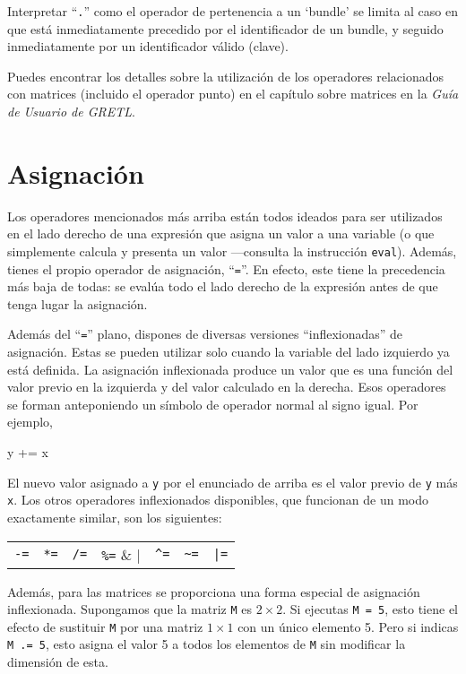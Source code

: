 Interpretar ``\texttt{.}'' como el operador de pertenencia  a un `bundle'
se limita al caso en que está inmediatamente precedido por el identificador
de un bundle, y seguido inmediatamente por un identificador válido (clave).

Puedes encontrar los detalles sobre la utilización de los operadores
relacionados con matrices (incluido el operador punto) en el capítulo sobre
matrices en la \textit{Guía de Usuario de GRETL}.

\section{Asignación}

Los operadores mencionados más arriba están todos ideados para ser utilizados
en el lado derecho de una expresión que asigna un valor a una variable (o que
simplemente calcula y presenta un valor ---consulta la instrucción \texttt{eval}).
Además, tienes el propio operador de asignación, ``\texttt{=}''. En efecto,
este tiene la precedencia más baja de todas: se evalúa todo el lado derecho
de la expresión antes de que tenga lugar la asignación.

Además del ``\texttt{=}'' plano, dispones de diversas versiones ``inflexionadas''
de asignación. Estas se pueden utilizar solo cuando la variable del lado izquierdo
ya está definida. La asignación inflexionada produce un valor que es una
función del valor previo en la izquierda y del valor calculado en la derecha.
Esos operadores se forman anteponiendo un símbolo de operador normal al signo igual.
Por ejemplo,
%
\begin{code}
y += x
\end{code}
%
El nuevo valor asignado a \texttt{y} por el enunciado de arriba es el valor
previo de \texttt{y} más \texttt{x}. Los otros operadores inflexionados
disponibles, que funcionan de un modo exactamente similar, son los
siguientes:

\begin{center}
\begin{tabular}{ccccccc}
\texttt{-=} & \texttt{*=} & \texttt{/=} & \verb|%=| & 
  \verb|^=| & \verb|~=| & \verb+|=+ \\
\end{tabular}
\end{center}

Además, para las matrices se proporciona una forma especial de asignación
inflexionada. Supongamos que la matriz \texttt{M} es $2 \times 2$. Si ejecutas
\texttt{M = 5}, esto tiene el efecto de sustituir \texttt{M} por una matriz
$1 \times 1$ con un único elemento 5. Pero si indicas \texttt{M .= 5}, esto
asigna el valor 5 a todos los elementos de \texttt{M} sin modificar la
dimensión de esta.

